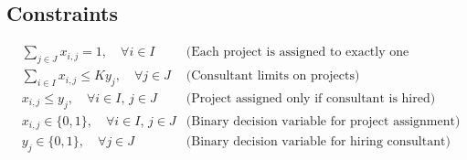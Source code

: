 \documentclass{article}
\begin{document}
\subsection*{Constraints}
\begin{align}
    & \sum_{j \in J} x_{i,j} = 1, \quad \forall i \in I & \text{(Each project is assigned to exactly one consultant)} \\
    & \sum_{i \in I} x_{i,j} \leq K y_j, \quad \forall j \in J & \text{(Consultant limits on projects)} \\
    & x_{i,j} \leq y_j, \quad \forall i \in I, \, j \in J & \text{(Project assigned only if consultant is hired)} \\
    & x_{i,j} \in \{0, 1\}, \quad \forall i \in I, \, j \in J & \text{(Binary decision variable for project assignment)} \\
    & y_j \in \{0, 1\}, \quad \forall j \in J & \text{(Binary decision variable for hiring consultant)}
\end{align}
\end{document}
